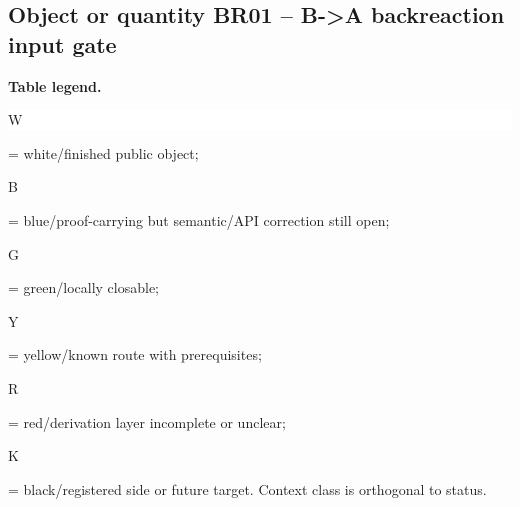 \subsection*{Object or quantity BR01 -- B->A backreaction input gate}
\hypertarget{objproof:BR01}{}
\par\smallskip\noindent\begin{minipage}{0.99\linewidth}\footnotesize\raggedright\textbf{Table legend.} \colorbox{white}{\strut W} = white/finished public object; \colorbox{cyan!20}{\strut B} = blue/proof-carrying but semantic/API correction still open; \colorbox{green!18}{\strut G} = green/locally closable; \colorbox{yellow!25}{\strut Y} = yellow/known route with prerequisites; \colorbox{red!20}{\strut R} = red/derivation layer incomplete or unclear; \colorbox{black!18}{\strut K} = black/registered side or future target. Context class is orthogonal to status.\end{minipage}\par\vspace{0.25em}
